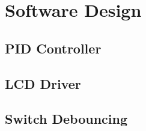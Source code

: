 \documentclass[12pt,letterpaper]{article}
\begin{document}
\section{Software Design}
\subsection{PID Controller}
\subsection{LCD Driver}
\subsection{Switch Debouncing}
\end{document}
